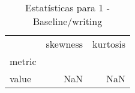 \begin{table}[htbp]
\caption{Estatísticas para 1 - Baseline/writing}
\label{tab:1_-_baseline_writing_skewkurt}
\begin{tabular}{lrr}
\toprule
 & skewness & kurtosis \\
metric &  &  \\
\midrule
value & NaN & NaN \\
\bottomrule
\end{tabular}
\end{table}
